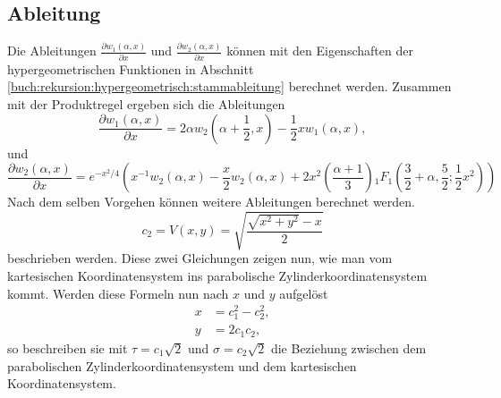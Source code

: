 \subsection{Ableitung}
Die Ableitungen $\frac{\partial w_1(\alpha, x)}{\partial x}$ und $\frac{\partial w_2(\alpha, x)}{\partial x}$ 
können mit den Eigenschaften der hypergeometrischen Funktionen in Abschnitt 
\ref{buch:rekursion:hypergeometrisch:stammableitung} berechnet werden. 
Zusammen mit der Produktregel ergeben sich die Ableitungen
\begin{equation}
	\frac{\partial w_1(\alpha,x)}{\partial x} = 2\alpha w_2(\alpha + \frac{1}{2}, x) - \frac{1}{2} x w_1(\alpha, x),
\end{equation} 
und
\begin{equation}
	\frac{\partial w_2(\alpha,x)}{\partial x} = e^{-x^2/4} \left(
	x^{-1} w_2(\alpha, x) - \frac{x}{2} w_2(\alpha, x) + 2 x^2 \left(\frac{\alpha + 1}{3}\right)
	{}_{1} F_{1} (
	{\textstyle \frac{3}{2}} 
	+ \alpha, {\textstyle \frac{5}{2}} ; {\textstyle \frac{1}{2}}x^2)
	\right)
\end{equation}
Nach dem selben Vorgehen können weitere Ableitungen berechnet werden.
\begin{equation}
	c_2 = V(x,y) = \sqrt{\frac{\sqrt{x^2+y^2} - x}{2}}
\end{equation}
beschrieben werden. Diese zwei Gleichungen zeigen nun, wie man vom 
kartesischen Koordinatensystem ins parabolische Zylinderkoordinatensystem kommt.
Werden diese Formeln nun nach $x$ und $y$ aufgelöst 
\begin{align}
	x &=  c_1^2 - c_2^2 ,\\
	y &= 2c_1 c_2,
\end{align}
so beschreiben sie mit $\tau = c_1 \sqrt{2}$ und $\sigma = c_2 \sqrt{2}$ die Beziehung 
zwischen dem parabolischen Zylinderkoordinatensystem und dem kartesischen Koordinatensystem.
